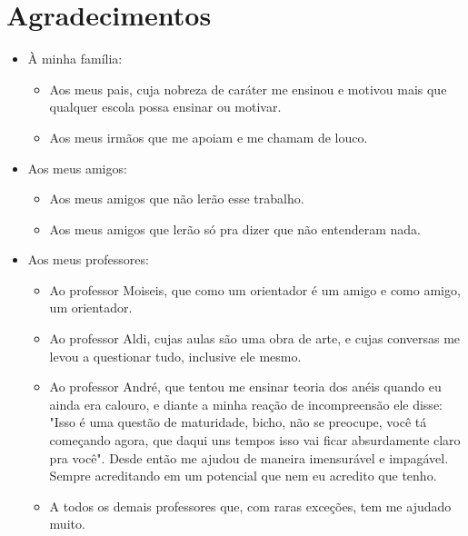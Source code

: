 %


\chapter*{Agradecimentos}

\begin{itemize}
\item À minha família:

\begin{itemize}
\item Aos meus pais, cuja nobreza de caráter me ensinou e motivou mais que qualquer escola possa ensinar ou motivar.
\item Aos meus irmãos que me apoiam e me chamam de louco.
\end{itemize}

\item Aos meus amigos:

\begin{itemize}
\item Aos meus amigos que não lerão esse trabalho.
\item Aos meus amigos que lerão só pra dizer que não entenderam nada.
\end{itemize}

\item Aos meus professores:

\begin{itemize}
\item Ao professor Moiseis, que como um orientador é um amigo e como amigo, um orientador.
\item Ao professor Aldi, cujas aulas são uma obra de arte, e cujas conversas me levou a questionar tudo, inclusive ele mesmo. 
\item Ao professor André, que tentou me ensinar teoria dos anéis quando eu ainda era calouro, e diante a minha reação de incompreensão ele disse: "Isso é uma questão de maturidade, bicho, não se preocupe, você tá começando agora, que daqui uns tempos isso vai ficar absurdamente claro pra você". Desde então me ajudou de maneira imensurável e impagável. Sempre acreditando em um potencial que nem eu acredito que tenho.
\item A todos os demais professores que, com raras exceções, tem me ajudado muito.


\end{itemize}

\end{itemize}



%